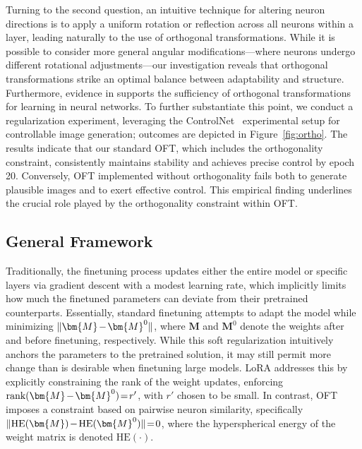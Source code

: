 Turning to the second question, an intuitive technique for altering neuron directions is to apply a uniform rotation or reflection across all neurons within a layer, leading naturally to the use of orthogonal transformations. While it is possible to consider more general angular modifications—where neurons undergo different rotational adjustments—our investigation reveals that orthogonal transformations strike an optimal balance between adaptability and structure. Furthermore, evidence in \cite{liu2021orthogonal} supports the sufficiency of orthogonal transformations for learning in neural networks. To further substantiate this point, we conduct a regularization experiment, leveraging the ControlNet~\cite{zhang2023adding} experimental setup for controllable image generation; outcomes are depicted in Figure~\ref{fig:ortho}. The results indicate that our standard OFT, which includes the orthogonality constraint, consistently maintains stability and achieves precise control by epoch 20. Conversely, OFT implemented without orthogonality fails both to generate plausible images and to exert effective control. This empirical finding underlines the crucial role played by the orthogonality constraint within OFT.

\subsection{General Framework}

Traditionally, the finetuning process updates either the entire model or specific layers via gradient descent with a modest learning rate, which implicitly limits how much the finetuned parameters can deviate from their pretrained counterparts. Essentially, standard finetuning attempts to adapt the model while minimizing $\thickmuskip=2mu \medmuskip=2mu \| \bm{M} - \bm{M}^0\|$, where $\bm{M}$ and $\bm{M}^0$ denote the weights after and before finetuning, respectively. While this soft regularization intuitively anchors the parameters to the pretrained solution, it may still permit more change than is desirable when finetuning large models. LoRA addresses this by explicitly constraining the rank of the weight updates, enforcing $\thickmuskip=2mu \medmuskip=2mu \text{rank}(\bm{M} - \bm{M}^0)=r'$, with $r'$ chosen to be small. In contrast, OFT imposes a constraint based on pairwise neuron similarity, specifically $\thickmuskip=2mu \medmuskip=2mu \| \text{HE}(\bm{M})-\text{HE}(\bm{M}^0) \|=0$, where the hyperspherical energy of the weight matrix is denoted $\text{HE}(\cdot)$. 

